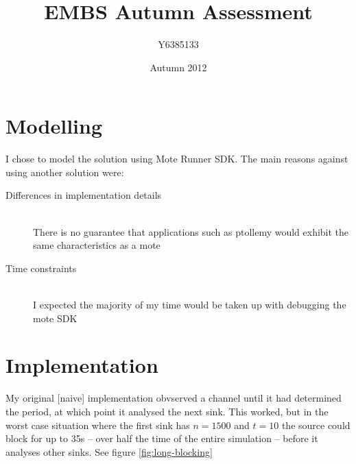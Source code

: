 \documentclass{article}
\title{EMBS Autumn Assessment}
\author{Y6385133}
\date{Autumn 2012}
\begin{document}
\maketitle

\section{Modelling}
I chose to model the solution using Mote Runner SDK. The main reasons against using another solution were:

\begin{description}
    \item[Differences in implementation details] \hfill \\
        There is no guarantee that applications such as ptollemy would exhibit the same characteristics as a mote
    \item[Time constraints] \hfill \\
        I expected the majority of my time would be taken up with debugging the mote {SDK}
\end{description}

\section{Implementation}

My original [naive] implementation obvserved a channel until it had determined the period, at which point it analysed
the next sink. This worked, but in the worst case situation where the first sink has $n=1500$ and $t=10$ the source could block
for up to 35s -- over half the time of the entire simulation -- before it analyses other sinks. See figure \ref{fig:long-blocking}
\end{document}
